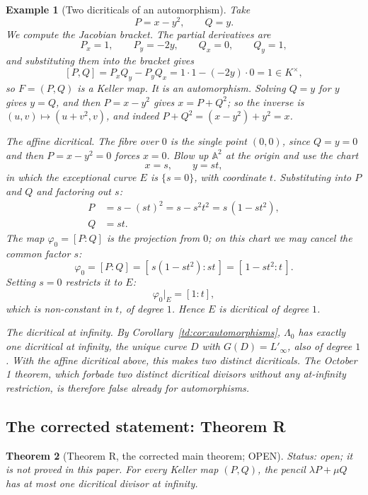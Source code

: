 \documentclass[a4paper,11pt]{article}
\theoremstyle{jsplain}
\newtheorem{theorem}{Theorem}[section]
\theoremstyle{jsdef}
\newtheorem{example}[theorem]{Example}
\theoremstyle{jsrem}
\begin{document}
\begin{example}[Two dicriticals of an automorphism]\label{td:ex:automorphism}
Take
\begin{equation}\label{td:eq:auto-map}
P = x - y^2, \qquad Q = y.
\end{equation}
We compute the Jacobian bracket. The partial derivatives are
\[
P_x = 1, \qquad P_y = -2y, \qquad Q_x = 0, \qquad Q_y = 1,
\]
and substituting them into the bracket gives
\[
[P,Q] = P_x Q_y - P_y Q_x = 1 \cdot 1 - (-2y) \cdot 0 = 1 \in K^\times,
\]
so $F = (P,Q)$ is a Keller map. It is an automorphism. Solving $Q = y$ for $y$ gives $y = Q$,
and then $P = x - y^2$ gives $x = P + Q^2$; so the inverse is $(u,v) \mapsto (u + v^2, v)$, and
indeed $P + Q^2 = (x - y^2) + y^2 = x$.

\emph{The affine dicritical.} The fibre over $0$ is the single point $(0,0)$, since $Q = y = 0$
and then $P = x - y^2 = 0$ forces $x = 0$. Blow up $\mathbb{A}^2$ at the origin and use the chart
\[
x = s, \qquad y = s t,
\]
in which the exceptional curve $E$ is $\{s = 0\}$, with coordinate $t$. Substituting into $P$ and
$Q$ and factoring out $s$:
\begin{align*}
P &= s - (st)^2 = s - s^2 t^2 = s\,(1 - s t^2), \\
Q &= s t.
\end{align*}
The map $\varphi_0 = [P : Q]$ is the projection from $0$; on this chart we may cancel the common
factor $s$:
\[
\varphi_0 = [P : Q] = [\,s(1 - s t^2) : s t\,] = [\,1 - s t^2 : t\,].
\]
Setting $s = 0$ restricts it to $E$:
\[
\varphi_0|_E = [1 : t],
\]
which is non-constant in $t$, of degree $1$. Hence $E$ is dicritical of degree $1$.

\emph{The dicritical at infinity.} By Corollary~\ref{td:cor:automorphisms}, $\Lambda_0$ has
exactly one dicritical at infinity, the unique curve $D$ with $G(D) = L'_\infty$, also of degree
$1$. With the affine dicritical above, this makes two distinct dicriticals. The October 1
theorem, which forbade two distinct dicritical divisors without any at-infinity restriction, is
therefore false already for automorphisms.
\end{example}

\subsection{The corrected statement: Theorem R}

\begin{theorem}[Theorem R, the corrected main theorem; OPEN]\label{td:thm:R}
\textit{Status: open; it is not proved in this paper.}
For every Keller map $(P,Q)$, the pencil $\lambda P + \mu Q$ has at most one dicritical
divisor at infinity.
\end{theorem}
\end{document}
